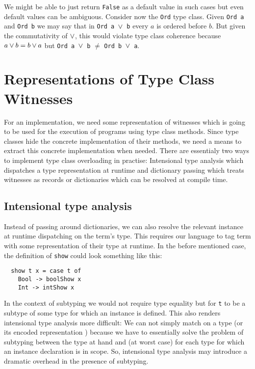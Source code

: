 We might be able to just return \texttt{False} as a default value in such cases but even default values can be ambiguous.
Consider now the \texttt{Ord} type class. Given \texttt{Ord a} and \texttt{Ord b} we may say that in \texttt{Ord a $\vee$ b} every $a$ is ordered before $b$.
But given the commutativity of $\vee$, this would violate type class coherence because $a \vee b = b \vee a$ but \texttt{Ord a $\vee$ b} $\neq$ \texttt{Ord b $\vee$ a}.


\section{Representations of Type Class Witnesses} %
\label{sec:representations}

For an implementation, we need some representation of witnesses which is going to be used for the execution of programs using type class methods.
Since type classes hide the concrete implementation of their methods, we need a means to extract this concrete implementation when needed.
There are essentialy two ways to implement type class overloading in practise: Intensional type analysis which dispatches a type representation at runtime and dictionary passing which treats witnesses as records or dictionaries which can be resolved at compile time.

\subsection{Intensional type analysis}
\label{sec:intensional-analysis}

Instead of passing around dictionaries, we can also resolve the relevant instance at runtime dispatching on the term's type.
This requires our language to tag term with some representation of their type at runtime.
In the before mentioned case, the definition of \texttt{show} could look something like this:

\begin{verbatim}
  show t x = case t of
    Bool -> boolShow x
    Int -> intShow x
\end{verbatim}

In the context of subtyping we would not require type equality but for \texttt{t} to be a subtype of some type for which an instance is defined.
This also renders intensional type analysis more difficult:
We can not simply match on a type (or its encoded representation \cite{weirich2000}) because we have to essentially solve the problem of subtyping between the type at hand and (at worst case) for each type for which an instance declaration is in scope.
So, intensional type analysis may introduce a dramatic overhead in the presence of subtyping.

